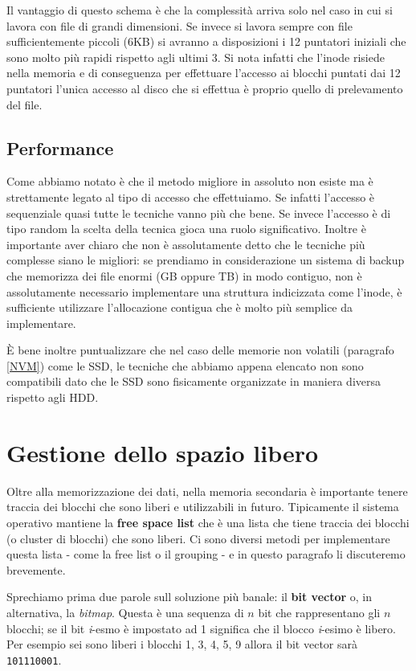 Il vantaggio di questo schema è che la complessità arriva solo nel caso in cui si lavora con file di grandi dimensioni. Se invece si lavora sempre con file sufficientemente piccoli (6KB) si avranno a disposizioni i 12 puntatori iniziali che sono molto più rapidi rispetto agli ultimi 3. Si nota infatti che l'inode risiede nella memoria e di conseguenza per effettuare l'accesso ai blocchi puntati dai 12 puntatori l'unica accesso al disco che si effettua è proprio quello di prelevamento del file. 

% 
\subsection{Performance}\label{performance SSD}
Come abbiamo notato è che il metodo migliore in assoluto non esiste ma è strettamente legato al tipo di accesso che effettuiamo. Se infatti l'accesso è sequenziale quasi tutte le tecniche vanno più che bene. Se invece l'accesso è di tipo random la scelta della tecnica gioca una ruolo significativo. Inoltre è importante aver chiaro che non è assolutamente detto che le tecniche più complesse siano le migliori: se prendiamo in considerazione un sistema di backup che memorizza dei file enormi (GB oppure TB) in modo contiguo, non è assolutamente necessario implementare una struttura indicizzata come l'inode, è sufficiente utilizzare l'allocazione contigua che è molto più semplice da implementare.

È bene inoltre puntualizzare che nel caso delle memorie non volatili (paragrafo \ref{NVM}) come le SSD, le tecniche che abbiamo appena elencato non sono compatibili dato che le SSD sono fisicamente organizzate in maniera diversa rispetto agli HDD.

% 
\section{Gestione dello spazio libero}\label{free space}
Oltre alla memorizzazione dei dati, nella memoria secondaria è importante tenere traccia dei blocchi che sono liberi e utilizzabili in futuro. Tipicamente il sistema operativo mantiene la \textbf{free space list} che è una lista che tiene traccia dei blocchi (o cluster di blocchi) che sono liberi. Ci sono diversi metodi per implementare questa lista - come la free list o il grouping - e in questo paragrafo li discuteremo brevemente. 

Sprechiamo prima due parole sull soluzione più banale: il \textbf{bit vector} o, in alternativa, la \textit{bitmap}. Questa è una sequenza di $n$ bit che rappresentano gli $n$ blocchi; se il bit \textit{i}-esmo è impostato ad 1 significa che il blocco \textit{i}-esimo è libero. Per esempio sei sono liberi i blocchi 1, 3, 4, 5, 9 allora il bit vector sarà \texttt{101110001}.

